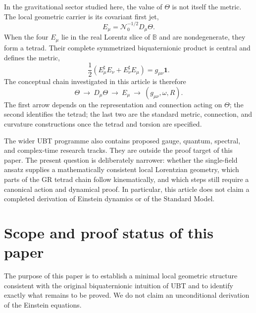 \documentclass[12pt,a4paper]{article}
\theoremstyle{remark}\newtheorem{remark}[definition]{Remark}
\newcommand{\B}{\mathbb B}
\begin{document}
In the gravitational sector studied here, the value of $\Theta$ is not itself
the metric.  The local geometric carrier is its covariant first jet,
\begin{equation}
 E_\mu=\mathcal N_0^{-1/2}D_\mu\Theta.
 \label{eq:intro-tetrad}
\end{equation}
When the four $E_\mu$ lie in the real Lorentz slice of $\B$ and are
nondegenerate, they form a tetrad.  Their complete symmetrized biquaternionic
product is central and defines the metric,
\begin{equation}
 \frac12\left(E_\mu^\sharp E_\nu+E_\nu^\sharp E_\mu\right)
 =g_{\mu\nu}\mathbf1.
 \label{eq:intro-metric}
\end{equation}
The conceptual chain investigated in this article is therefore
\begin{equation}
 \boxed{\Theta\ \longrightarrow\ D_\mu\Theta\ \longrightarrow\ E_\mu
 \ \longrightarrow\ (g_{\mu\nu},\omega,R).}
 \label{eq:ubt-geometric-chain}
\end{equation}
The first arrow depends on the representation and connection acting on
$\Theta$; the second identifies the tetrad; the last two are the standard
metric, connection, and curvature constructions once the tetrad and torsion
are specified.

The wider UBT programme also contains proposed gauge, quantum, spectral, and
complex-time research tracks.  They are outside the proof target of this
paper.  The present question is deliberately narrower: whether the single-field
ansatz supplies a mathematically consistent local Lorentzian geometry, which
parts of the GR tetrad chain follow kinematically, and which steps still require
a canonical action and dynamical proof.  In particular, this article does not
claim a completed derivation of Einstein dynamics or of the Standard Model.

\section{Scope and proof status of this paper}
The purpose of this paper is to establish a minimal local geometric structure
consistent with the original biquaternionic intuition of UBT and to identify
exactly what remains to be proved.  We do not claim an unconditional derivation
of the Einstein equations.
\end{document}
